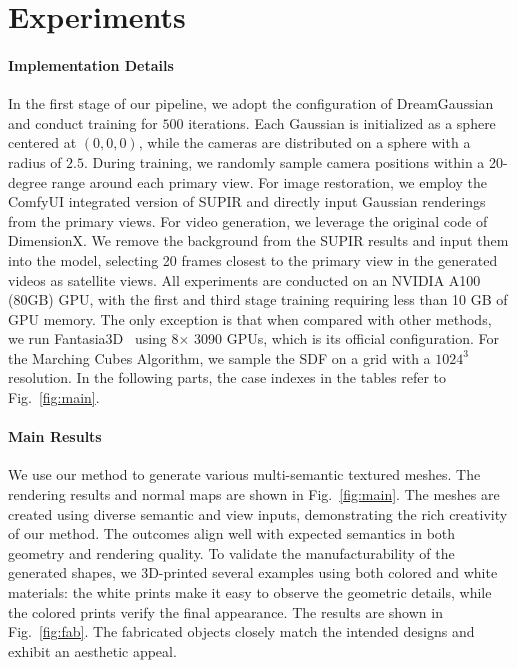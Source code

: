 \section{Experiments}
\paragraph{Implementation Details}
In the first stage of our pipeline, we adopt the configuration of DreamGaussian~\cite{tang2023dreamgaussian} and conduct training for $500$ iterations. Each Gaussian is initialized as a sphere centered at $(0,0,0)$, while the cameras are distributed on a sphere with a radius of $2.5$. During training, we randomly sample camera positions within a 20-degree range around each primary view. 
For image restoration, we employ the ComfyUI integrated version of SUPIR and directly input Gaussian renderings from the primary views. 
For video generation, we leverage the original code of DimensionX. We remove the background from the SUPIR results and input them into the model, selecting 20 frames closest to the primary view in the generated videos as satellite views.
All experiments are conducted on an NVIDIA A100 (80GB) GPU, with the first and third stage training requiring less than 10 GB of GPU memory. The only exception is that when compared with other methods, we run Fantasia3D~\cite{chen2023fantasia3d} using 8$\times$ 3090 GPUs, which is its official configuration. For the Marching Cubes Algorithm, we sample the SDF on a grid with a $1024^3$ resolution. In the following parts, the case indexes in the tables refer to  Fig.~\ref{fig:main}.




\paragraph{Main Results}
We use our method to generate various multi-semantic textured meshes. The rendering results and normal maps are shown in Fig.~\ref{fig:main}. The meshes are created using diverse semantic and view inputs, demonstrating the rich creativity of our method. The outcomes align well with expected semantics in both geometry and rendering quality. To validate the manufacturability of the generated shapes, we 3D-printed several examples using both colored and white materials: the white prints make it easy to observe the geometric details, while the colored prints verify the final appearance. The results are shown in Fig.~\ref{fig:fab}. The fabricated objects closely match the intended designs and exhibit an aesthetic appeal.

